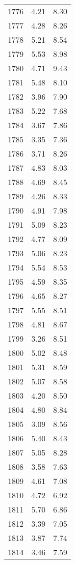 \begin{longtable}{lrr}
1776 &    4.21 &    8.30 \\
1777 &    4.28 &    8.26 \\
1778 &    5.21 &    8.54 \\
1779 &    5.53 &    8.98 \\
1780 &    4.71 &    9.43 \\
1781 &    5.48 &    8.10 \\
1782 &    3.96 &    7.90 \\
1783 &    5.22 &    7.68 \\
1784 &    3.67 &    7.86 \\
1785 &    3.35 &    7.36 \\
1786 &    3.71 &    8.26 \\
1787 &    4.83 &    8.03 \\
1788 &    4.69 &    8.45 \\
1789 &    4.26 &    8.33 \\
1790 &    4.91 &    7.98 \\
1791 &    5.09 &    8.23 \\
1792 &    4.77 &    8.09 \\
1793 &    5.06 &    8.23 \\
1794 &    5.54 &    8.53 \\
1795 &    4.59 &    8.35 \\
1796 &    4.65 &    8.27 \\
1797 &    5.55 &    8.51 \\
1798 &    4.81 &    8.67 \\
1799 &    3.26 &    8.51 \\
1800 &    5.02 &    8.48 \\
1801 &    5.31 &    8.59 \\
1802 &    5.07 &    8.58 \\
1803 &    4.20 &    8.50 \\
1804 &    4.80 &    8.84 \\
1805 &    3.09 &    8.56 \\
1806 &    5.40 &    8.43 \\
1807 &    5.05 &    8.28 \\
1808 &    3.58 &    7.63 \\
1809 &    4.61 &    7.08 \\
1810 &    4.72 &    6.92 \\
1811 &    5.70 &    6.86 \\
1812 &    3.39 &    7.05 \\
1813 &    3.87 &    7.74 \\
1814 &    3.46 &    7.59 \\

\end{longtable}
